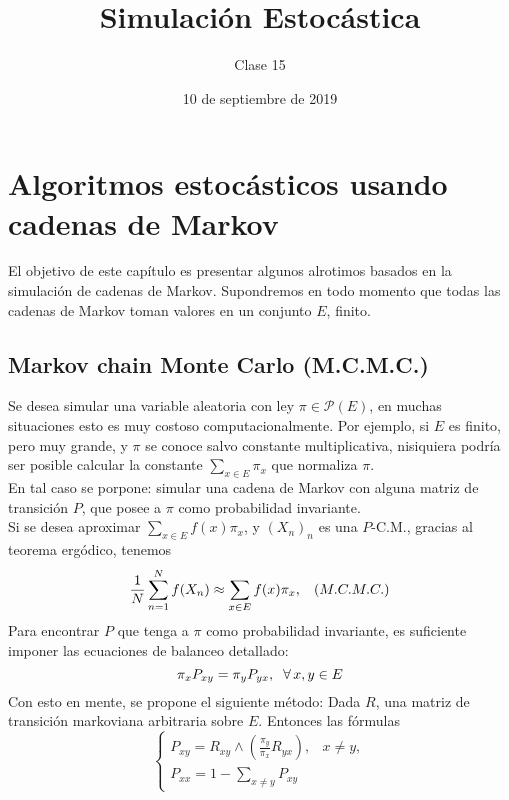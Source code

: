 \documentclass[a4paper]{article}
\title{Simulación Estocástica}
\author{Clase 15}
\date{10 de septiembre de 2019}
\numberwithin{equation}{subsection}
\numberwithin{definicion}{subsection}
\begin{document}
\maketitle

\section{Algoritmos estocásticos usando cadenas de Markov}
El objetivo de este capítulo es presentar algunos alrotimos basados en la simulación de cadenas de Markov. Supondremos en todo momento que todas las cadenas de Markov toman valores en un conjunto $E$, finito.

\subsection{Markov chain Monte Carlo (M.C.M.C.)}
Se desea simular una variable aleatoria con ley $\pi \in \mathcal{P}(E)$, en muchas situaciones esto es muy costoso computacionalmente. Por ejemplo, si $E$ es finito, pero muy grande, y $\pi$ se conoce salvo constante multiplicativa, nisiquiera podría ser posible calcular la constante $\sum_{x\in E}\pi_x$ que normaliza $\pi$.\\ \newline
En tal caso se porpone: simular una cadena de Markov con alguna matriz de transición $P$, que posee a $\pi$ como probabilidad invariante.\\ \newline
Si se desea aproximar $\sum_{x\in E} f(x)\pi_x$, y $(X_n)_n$ es una $P$-C.M., gracias al teorema ergódico, tenemos
\[\frac{1}{N} \sum_{n=1}^N f(X_n) \approx \sum_{x\in E}f(x)\pi_x,\hspace{0.3cm}(M.C.M.C.)\]
Para encontrar $P$ que tenga a $\pi$ como probabilidad invariante, es suficiente imponer las ecuaciones de balanceo detallado:
\begin{equation}
    \pi_x P_{xy} = \pi_y P_{yx},\hspace{0.2cm}\forall\,x,y\in E
    \label{clase15_1}
\end{equation}
Con esto en mente, se propone el siguiente método: Dada $R$, una matriz de transición markoviana arbitraria sobre $E$. Entonces las fórmulas
\begin{equation}
    \begin{cases}
        P_{xy} = R_{xy}\wedge \left(\frac{\pi_y}{\pi_x}R_{yx}\right), & x \neq y,\\
        P_{xx} = 1-\sum_{x\neq y}P_{xy}
    \end{cases}
    \label{clase15_2}
\end{equation}
\end{document}
